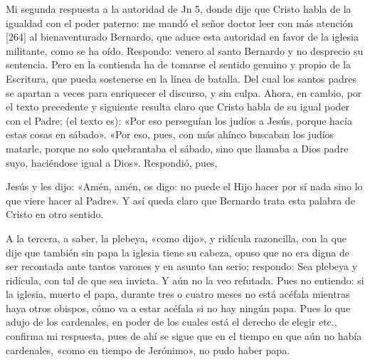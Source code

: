 Mi segunda respuesta a la autoridad de Jn 5, donde dije que Cristo habla de la igualdad con el poder paterno: me mandó el señor doctor leer con más atención [264] al bienaventurado Bernardo, que aduce esta autoridad en favor de la iglesia militante, como se ha oído. Respondo: venero al santo Bernardo y no desprecio su sentencia. Pero en la contienda ha de tomarse el sentido genuino y propio de la Escritura, que pueda sostenerse en la línea de batalla. Del cual los santos padres se apartan a veces para enriquecer el discurso, y sin culpa. Ahora, en cambio, por el texto precedente y siguiente resulta claro que Cristo habla de su igual poder con el Padre; (el texto es): «Por eso perseguían los judíos a Jesús, porque hacía estas cosas en sábado». «Por eso, pues, con más ahínco buscaban los judíos matarle, porque no solo quebrantaba el sábado, sino que llamaba a Dios padre suyo, haciéndose igual a Dios». Respondió, pues,

Jesús y les dijo: «Amén, amén, os digo: no puede el Hijo hacer por sí nada sino lo que viere hacer al Padre». Y así queda claro que Bernardo trata esta palabra de Cristo en otro sentido.

A la tercera, a saber, la plebeya, «como dijo», y ridícula razoncilla, con la que dije que también sin papa la iglesia tiene su cabeza, opuso que no era digna de ser recontada ante tantos varones y en asunto tan serio; respondo: Sea plebeya y ridícula, con tal de que sea invicta. Y aún no la veo refutada. Pues no entiendo: si la iglesia, muerto el papa, durante tres o cuatro meses no está acéfala mientras haya otros obispos, cómo va a estar acéfala si no hay ningún papa. Pues lo que adujo de los cardenales, en poder de los cuales está el derecho de elegir etc., confirma mi respuesta, pues de ahí se sigue que en el tiempo en que aún no había cardenales, «como en tiempo de Jerónimo», no pudo haber papa.

